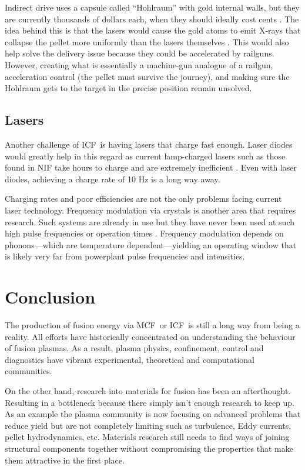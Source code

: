 \documentclass[12pt, a4paper]{article}
\newcommand{\mc}{MCF}
\newcommand{\ic}{ICF}
\begin{document}
			Indirect drive uses a capsule called ``Hohlraum'' with gold internal walls, but they are currently thousands of dollars each, when they should ideally cost cents \cite{hohcost}. The idea behind this is that the lasers would cause the gold atoms to emit X-rays that collapse the pellet more uniformly than the lasers themselves \cite{ddvsid}. This would also help solve the delivery issue because they could be accelerated by railguns. However, creating what is essentially a machine-gun analogue of a railgun, acceleration control (the pellet must survive the journey), and making sure the Hohlraum gets to the target in the precise position remain unsolved.
		\subsection{Lasers}
			Another challenge of \ic~is having lasers that charge fast enough. Laser diodes would greatly help in this regard as current lamp-charged lasers such as those found in NIF take hours to charge and are extremely inefficient \cite{leff}. Even with laser diodes, achieving a charge rate of 10 Hz is a long way away.
			
			Charging rates and poor efficiencies are not the only problems facing current laser technology. Frequency modulation via crystals is another area that requires research. Such systems are already in use but they have never been used at such high pulse frequencies or operation times \cite{fmod1, fmod2}. Frequency modulation depends on phonons---which are temperature dependent---yielding an operating window that is likely very far from powerplant pulse frequencies and intensities.
	\section{Conclusion}
		The production of fusion energy via \mc~or \ic~is still a long way from being a reality. All efforts have historically concentrated on understanding the behaviour of fusion plasmas. As a result, plasma physics, confinement, control and diagnostics have vibrant experimental, theoretical and computational communities.
		
		On the other hand, research into materials for fusion has been an afterthought. Resulting in a bottleneck because there simply isn't enough research to keep up. As an example the plasma community is now focusing on advanced problems that reduce yield but are not completely limiting such as turbulence, Eddy currents, pellet hydrodynamics, etc. Materials research still needs to find ways of joining structural components together without compromising the properties that make them attractive in the first place.
		
\end{document}
